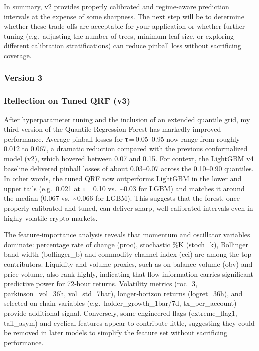\documentclass[
  a4paper,
  DIV=11,
  numbers=noendperiod]{scrreprt}
\begin{document}
In summary, v2 provides properly calibrated and regime‑aware prediction
intervals at the expense of some sharpness. The next step will be to
determine whether these trade‑offs are acceptable for your application
or whether further tuning (e.g.~adjusting the number of trees, minimum
leaf size, or exploring different calibration stratifications) can
reduce pinball loss without sacrificing coverage.

\subsubsection{Version 3}\label{version-3}

\subsubsection{Reflection on Tuned QRF
(v3)}\label{reflection-on-tuned-qrf-v3}

After hyperparameter tuning and the inclusion of an extended quantile
grid, my third version of the Quantile Regression Forest has markedly
improved performance. Average pinball losses for τ\,=\,0.05--0.95 now
range from roughly 0.012 to 0.067, a dramatic reduction compared with
the previous conformalized model (v2), which hovered between 0.07 and
0.15. For context, the LightGBM v4 baseline delivered pinball losses of
about 0.03--0.07 across the 0.10--0.90 quantiles. In other words, the
tuned QRF now outperforms LightGBM in the lower and upper tails
(e.g.~0.021 at τ\,=\,0.10 vs.~\textasciitilde0.03 for LGBM) and matches
it around the median (0.067 vs.~\textasciitilde0.066 for LGBM). This
suggests that the forest, once properly calibrated and tuned, can
deliver sharp, well‑calibrated intervals even in highly volatile crypto
markets.

The feature‑importance analysis reveals that momentum and oscillator
variables dominate: percentage rate of change (proc), stochastic \%K
(stoch\_k), Bollinger band width (bollinger\_b) and commodity channel
index (cci) are among the top contributors. Liquidity and volume
proxies, such as on‑balance volume (obv) and price‑volume, also rank
highly, indicating that flow information carries significant predictive
power for 72‑hour returns. Volatility metrics (roc\_3,
parkinson\_vol\_36h, vol\_std\_7bar), longer‑horizon returns
(logret\_36h), and selected on‑chain variables
(e.g.~holder\_growth\_1bar/7d, tx\_per\_account) provide additional
signal. Conversely, some engineered flags (extreme\_flag1, tail\_asym)
and cyclical features appear to contribute little, suggesting they could
be removed in later models to simplify the feature set without
sacrificing performance.
\end{document}
